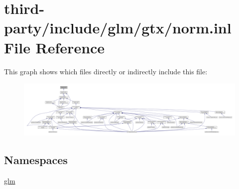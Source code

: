 \hypertarget{norm_8inl}{}\section{third-\/party/include/glm/gtx/norm.inl File Reference}
\label{norm_8inl}
This graph shows which files directly or indirectly include this file\+:
\nopagebreak
\begin{figure}[H]
\begin{center}
\leavevmode
\includegraphics[width=350pt]{norm_8inl__dep__incl}
\end{center}
\end{figure}
\subsection*{Namespaces}
\begin{DoxyCompactItemize}
\item 
 \hyperlink{namespaceglm}{glm}
\end{DoxyCompactItemize}
